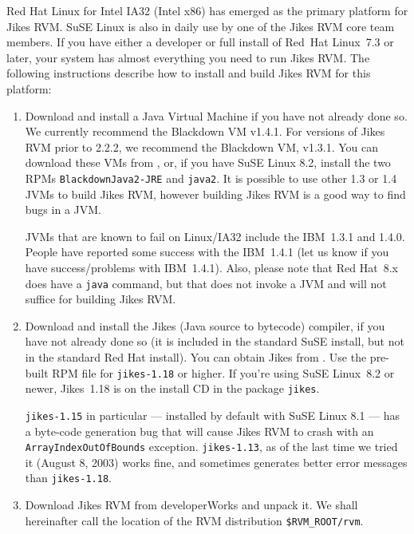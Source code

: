 Red Hat\TMboth{} Linux\Rboth{} for Intel\Rboth{} IA32 (Intel x86) has emerged as the 
primary platform for Jikes RVM.  SuSE\Rboth{} Linux is also in daily use
by one of the Jikes RVM core team members.
If you have either a developer or full install of Red~Hat
Linux~7.3 or later, your system has almost everything you need
to run Jikes RVM.  The following instructions describe how to install
and build Jikes RVM for this platform:
\begin{enumerate}

%
%
%
\item Download and install a Java\TMweb{} Virtual Machine if you have not
already done so.  We currently recommend the Blackdown VM v1.4.1. 
For versions of Jikes RVM prior to 2.2.2, we recommend
the Blackdown VM, v1.3.1.  You can download these VMs from 
\xlink{{\tt \BlackdownURL}} {\BlackdownURL}, or, if you have SuSE
Linux 8.2, install the two RPMs {\tt Black\-downJa\-va2-JRE} and {\tt java2}. 
It is possible to use other 1.3 or 1.4 JVMs to build Jikes RVM,
however building Jikes RVM is a good way to find bugs in a JVM.

%
JVMs that are known to fail on Linux/IA32 include the IBM\Rweb{}~1.3.1 and
1.4.0.  People have reported some success with the IBM~1.4.1 (let us
know if you have success/problems with IBM~1.4.1). Also, please note
that Red Hat~8.x does have a {\tt java} command, but that does not invoke a
JVM and will not suffice for building Jikes RVM.

%
\item Download and install the Jikes (Java source to bytecode)
compiler, if you have not already 
done so (it is included in the standard SuSE install, but not in
the standard Red Hat install).  You can 
obtain Jikes from .
Use the pre-built RPM file for {\tt jikes-1.18} or higher.   
If you're using SuSE Linux~8.2 or newer, Jikes~1.18 is on the install
CD in the package {\tt jikes}.


{\tt jikes-1.15} in
particular --- installed by default with SuSE Linux 8.1 --- has a
byte-code generation bug that will cause Jikes RVM to crash with an
{\tt ArrayIndexOutOfBounds} exception.  {\tt jikes-1.13}, as of the last
time we tried it (August 8, 2003) works fine, and sometimes generates
better error messages than {\tt jikes-1.18}.

\item Download Jikes RVM from developerWorks and unpack it.  We shall
hereinafter call the location of the RVM distribution {\tt \$RVM\_ROOT/rvm}.



\end{enumerate}

